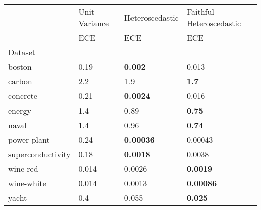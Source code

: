 \begin{tabular}{l|l|l|l}
\toprule
 & Unit Variance & Heteroscedastic & Faithful Heteroscedastic \\
 & ECE & ECE & ECE \\
Dataset &  &  &  \\
\midrule
boston & 0.19 & \bfseries 0.002 & 0.013 \\
carbon & 2.2 & 1.9 & \bfseries 1.7 \\
concrete & 0.21 & \bfseries 0.0024 & 0.016 \\
energy & 1.4 & 0.89 & \bfseries 0.75 \\
naval & 1.4 & 0.96 & \bfseries 0.74 \\
power plant & 0.24 & \bfseries 0.00036 & 0.00043 \\
superconductivity & 0.18 & \bfseries 0.0018 & 0.0038 \\
wine-red & 0.014 & 0.0026 & \bfseries 0.0019 \\
wine-white & 0.014 & 0.0013 & \bfseries 0.00086 \\
yacht & 0.4 & 0.055 & \bfseries 0.025 \\
\bottomrule
\end{tabular}
